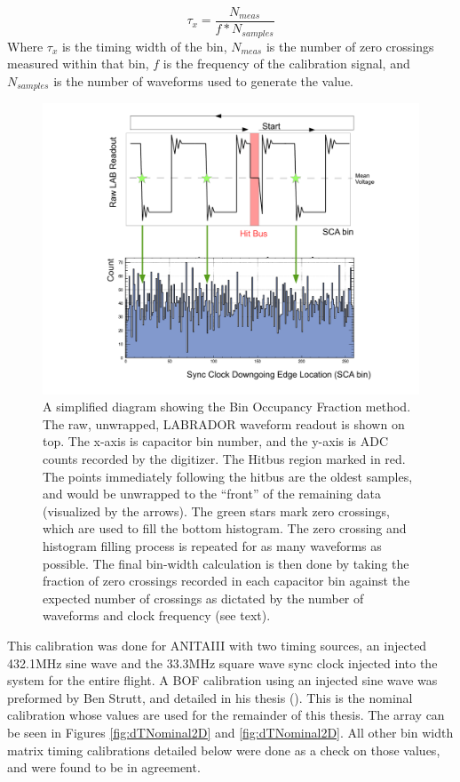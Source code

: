\begin{equation}
	\tau_{x} = \frac{N_{meas}}{f*N_{samples}}
	\label{eqn:BOF}
\end{equation}
		Where $\tau_{x}$ is the timing width of the bin, $N_{meas}$ is the number of zero crossings measured within that bin, $f$ is the frequency of the calibration signal, and $N_{samples}$ is the number of waveforms used to generate the value.
		
\begin{figure}
	\includegraphics[width=\textwidth]{figures/BOFdiagram}
	\caption{ A simplified diagram showing the Bin Occupancy Fraction method.  The raw, unwrapped, LABRADOR waveform readout is shown on top.  The x-axis is capacitor bin number, and the y-axis is ADC counts recorded by the digitizer. The Hitbus region marked in red. The points immediately following the hitbus are the oldest samples, and would be unwrapped to the ``front'' of the remaining data (visualized by the arrows).  The green stars mark zero crossings, which are used to fill the bottom histogram.  The zero crossing and histogram filling process is repeated for as many waveforms as possible.  The final bin-width calculation is then done by taking the fraction of zero crossings recorded in each capacitor bin against the expected number of crossings as dictated by the number of waveforms and clock frequency (see text). }
	\label{fig:BOFdiagram}
\end{figure}
		
		
		This calibration was done for ANITAIII with two timing sources, an injected 432.1MHz sine wave and the 33.3MHz square wave sync clock injected into the system for the entire flight.  A BOF calibration using an injected sine wave was preformed by Ben Strutt, and detailed in his thesis (\cite{BenSThesis}). This is the nominal calibration whose values are used for the remainder of this thesis.  The array can be seen in Figures \ref{fig:dTNominal2D} and \ref{fig:dTNominal2D}.  All other bin width matrix timing calibrations detailed below were done as a check on those values, and were found to be in agreement.
		
